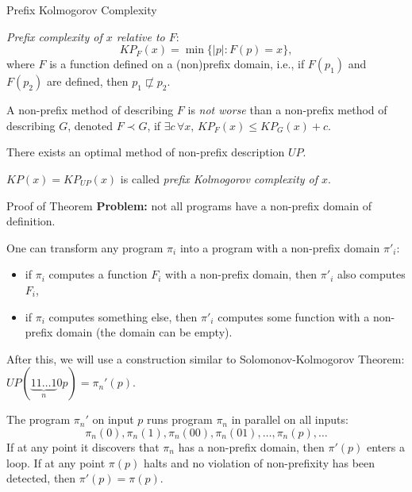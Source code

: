 \documentclass[aspectratio=169]{beamer}
\begin{document}
\begin{frame}{Prefix Kolmogorov Complexity}
    \begin{definition}
        \emph{Prefix complexity of $x$ relative to $F$}:
        \[
        KP_F(x) = \min \{|p| : F(p) = x\},
        \]
        where $F$ is a function defined on a (non)prefix domain, i.e., if $F(p_1)$ and $F(p_2)$ are defined, then $p_1 \not\sqsubset p_2$.
    \end{definition}
    \begin{definition}
        A non-prefix method of describing $F$ is \emph{not worse} than a non-prefix method of describing $G$, denoted $F \prec G$, if $\exists c \, \forall x, \, KP_F(x) \le KP_G(x) + c$.
    \end{definition}
    \begin{theorem}
        There exists an optimal method of non-prefix description $UP$.
    \end{theorem}

    \begin{definition}
        $KP(x) = KP_{UP}(x)$ is called \emph{prefix Kolmogorov complexity of $x$}.
    \end{definition}

\end{frame}

\begin{frame}{Proof of Theorem}
    \textbf{Problem:} not all programs have a non-prefix domain of definition. \\\medskip

    One can transform any program $\pi_i$ into a program with a non-prefix domain $\pi'_i$:
    \begin{itemize}
        \item if $\pi_i$ computes a function $F_i$ with a non-prefix domain, then $\pi'_i$ also computes $F_i$,
        \item if $\pi_i$ computes something else, then $\pi'_i$ computes some function with a non-prefix domain (the domain can be empty).
    \end{itemize}
    After this, we will use a construction similar to Solomonov-Kolmogorov Theorem:
    $UP(\underbrace{11\dotso 1}_n 0p) = \pi_n'(p)$.

    The program $\pi_n'$ on input $p$ runs program $\pi_n$ in parallel on all inputs:
    \[\pi_n(0), \pi_n(1), \pi_n(00), \pi_n(01), \dotsc, \pi_n(p), \dotsc\]
    If at any point it discovers that $\pi_n$ has a non-prefix domain, then $\pi'(p)$ enters a loop.
    If at any point $\pi(p)$ halts and no violation of non-prefixity has been detected, then $\pi'(p) = \pi(p)$.
\end{frame}
\end{document}

